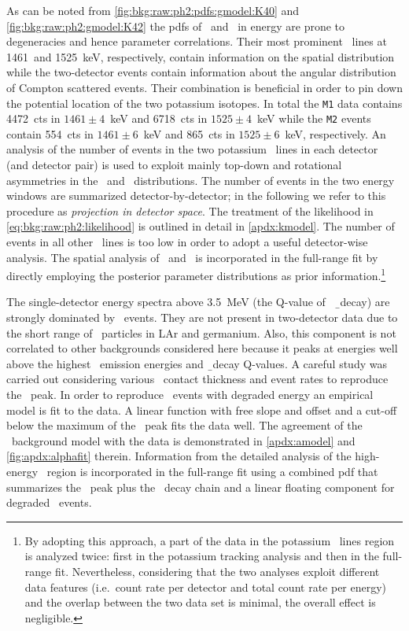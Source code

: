 As can be noted from \cref{fig:bkg:raw:ph2:pdfs:gmodel:K40} and
\cref{fig:bkg:raw:ph2:gmodel:K42} the pdfs of \kvn\ and \kvz\ in energy are prone to
degeneracies and hence parameter correlations. Their most prominent \g\ lines at 1461~and
1525~keV, respectively, contain information on the spatial distribution while the
two-detector events contain information about the angular distribution of Compton
scattered events. Their combination is beneficial in order to pin down the potential
location of the two potassium isotopes. In total the \texttt{M1} data contains 4472~cts in
$1461\pm4$~keV and 6718~cts in $1525\pm4$~keV while the \texttt{M2} events contain 554~cts
in $1461\pm6$~keV and 865~cts in $1525\pm6$~keV, respectively. An analysis of the number
of events in the two potassium \g\ lines in each detector (and detector pair) is used to
exploit mainly top-down and rotational asymmetries in the \kvn\ and \kvz\ distributions.
The number of events in the two energy windows are summarized detector-by-detector; in the
following we refer to this procedure as \textit{projection in detector space}. The
treatment of the likelihood in \cref{eq:bkg:raw:ph2:likelihood} is outlined in detail in
\cref{apdx:kmodel}.  The number of events in all other \g\ lines is too low in order to
adopt a useful detector-wise analysis. The spatial analysis of \kvn\ and \kvz\ is
incorporated in the full-range fit by directly employing the posterior parameter
distributions as prior information.\footnote{By adopting this approach, a part of the data
in the potassium \g\ lines region is analyzed twice: first in the potassium tracking
analysis and then in the full-range fit. Nevertheless, considering that the two analyses
exploit different data features (i.e.~count rate per detector and total count rate per
energy) and the overlap between the two data set is minimal, the overall effect is
negligible.}

The single-detector energy spectra above 3.5~MeV (the Q-value of \kvz\ \b\ decay) are
strongly dominated by \a\ events. They are not present in two-detector data due to the
short range of \a\ particles in LAr and germanium. Also, this component is not correlated
to other backgrounds considered here because it peaks at energies well above the highest
\g\ emission energies and \b\ decay Q-values. A careful study was carried out considering
various \pplus\ contact thickness and event rates to reproduce the \Po\ peak. In order to
reproduce \a\ events with degraded energy an empirical model is fit to the data. A linear
function with free slope and offset and a cut-off below the maximum of the \Po\ peak fits
the data well. The agreement of the \a\ background model with the data is demonstrated in
\cref{apdx:amodel} and \cref{fig:apdx:alphafit} therein. Information from the detailed
analysis of the high-energy \a\ region is incorporated in the full-range fit using a
combined pdf that summarizes the \Po\ peak plus the \Ra\ decay chain and a linear floating
component for degraded \a\ events.

